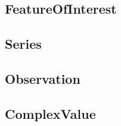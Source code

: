 \subsection{FeatureOfInterest}

\subsection{Series}

\subsection{Observation}

\subsection{ComplexValue}

